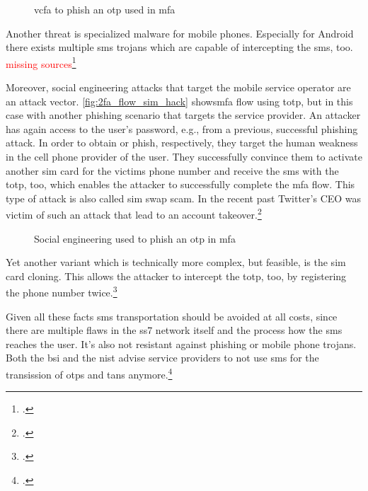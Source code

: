 \begin{figure}[hbt]
	\centering
	
	\caption[\gls{vcfa} to phish an \gls{otp} used in \gls{mfa}]{\gls{vcfa} to phish an \gls{otp} used in \gls{mfa}\footnotemark}
	\label{fig:2fa_flow_forward_phishing}
\end{figure}

Another threat is specialized malware for mobile phones. Especially for Android there exists multiple \gls{sms} trojans which are capable of intercepting the \gls{sms}, too. \textcolor{red}{missing sources}\footcites[See][146--149]{dmitrienko2014security}[See][152--154]{10.1007/978-3-642-39235-1_9}

\newpage

Moreover, social engineering attacks that target the mobile service operator are an attack vector. \autoref{fig:2fa_flow_sim_hack} shows\gls{mfa} flow using \gls{totp}, but in this case with another phishing scenario that targets the service provider. An attacker has again access to the user's password, e.g., from a previous, successful phishing attack. In order to obtain or phish, respectively, they target the human weakness in the cell phone provider of the user. They successfully convince them to activate another \gls{sim} card for the victims phone number and receive the \gls{sms} with the \gls{totp}, too, which enables the attacker to successfully complete the \gls{mfa} flow. This type of attack is also called \gls{sim} swap scam. In the recent past Twitter's CEO was victim of such an attack that lead to an account takeover.\footcite[See][]{twitter-hack}

\begin{figure}[hbt]
	\centering
	
	\caption[Social engineering used to phish an \gls{otp} in \gls{mfa}]{Social engineering used to phish an \gls{otp} in \gls{mfa}\footnotemark}
	\label{fig:2fa_flow_sim_hack}
\end{figure}

Yet another variant which is technically more complex, but feasible, is the \gls{sim} card cloning. This allows the attacker to intercept the \gls{totp}, too, by registering the phone number twice.\footcite[See][873]{eckert-it-sec-9}

Given all these facts \gls{sms} transportation should be avoided at all costs, since there are multiple flaws in the \gls{ss7} network itself and the process how the \gls{sms} reaches the user. It's also not resistant against phishing or mobile phone trojans. Both the \gls{bsi} and the \gls{nist} advise service providers to not use \gls{sms} for the transission of \glspl{otp} and \glspl{tan} anymore.\footcites[See][8]{JAKOBSSON20186}[See][27]{bsi2019recommendations2}[See][19]{SP80063B}

